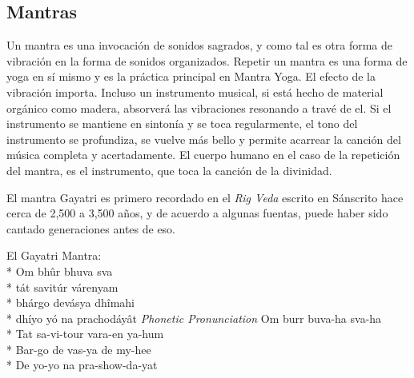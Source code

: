 \begin{itemize}
\section{Mantras}
Un mantra es una invocación de sonidos sagrados, y como tal es otra forma de vibración en la forma de sonidos organizados. Repetir un mantra es una forma de yoga en sí mismo y es la práctica principal en Mantra Yoga. El efecto de la vibración importa. Incluso un instrumento musical, si está hecho de material orgánico como madera, absorverá las vibraciones resonando a travé de el. Si el instrumento se mantiene en sintonía y se toca regularmente, el tono del instrumento se profundiza, se vuelve más bello y permite acarrear la canción del música completa y acertadamente. El cuerpo humano en el caso de la repetición del mantra, es el instrumento, que toca la canción de la divinidad.

El mantra Gayatri es primero recordado en el \textit{Rig Veda} escrito en Sánscrito hace cerca de 2,500 a 3,500 años, y de acuerdo a algunas fuentas, puede haber sido cantado generaciones antes de eso.

\begin{multicols}{2}
	El Gayatri Mantra:\\*
	Om bhûr bhuva sva\\*
	tát savitúr várenyam\\*
	bhárgo devásya dhîmahi\\*
	dhíyo yó na prachodáyât
	\columnbreak
	\textit{Phonetic Pronunciation}
	Om burr buva-ha sva-ha\\*
	Tat sa-vi-tour vara-en ya-hum\\*
	Bar-go de vas-ya de my-hee\\*
	De yo-yo na pra-show-da-yat
\end{multicols}


\end{itemize}
